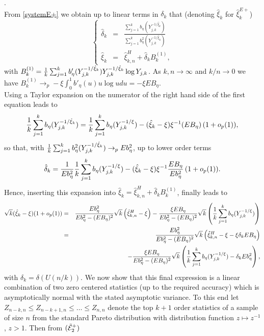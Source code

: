 \documentclass[twoside,leqno,11pt]{article}
\begin{document}
. \\
From \eqref{systemE+} we obtain up to linear terms in $\delta_k$ that (denoting $\hat{\xi}_k$ for $\hat{\xi}^{E+}_k$)
\[
\left\{
\begin{array}{lcl}
\hat{\delta}_k &=& \frac{\sum_{j=1}^k b_\eta (Y_{j,k}^{-1/\hat{\xi}_k})}{\sum_{j=1}^k b^2_\eta (Y_{j,k}^{-1/\hat{\xi}_k})} \\
\hat{\xi}_k &=& \hat{\xi}^H_{k,n} + \hat{\delta}_k B^{(1)}_{k},
\end{array}
\right.
\]
with $B^{(1)}_{k}= {1 \over k}\sum_{j=1}^k b'_\eta (Y_{j,k}^{-1/\hat{\xi}_k})Y_{j,k}^{-1/\hat{\xi}_k}\log Y_{j,k}$. As $k,n \to \infty$ and $k/n \to 0$ we have $B^{(1)}_{k} \to_p -\xi \int_0^1 b'_{\eta}(u) u \log u du = -\xi EB_\eta$.
\\
Using a Taylor expansion on the numerator of the right hand side of the first equation  leads to
\[
{1 \over k}\sum_{j=1}^k b_\eta (Y_{j,k}^{-1/\hat{\xi}_k})
=
{1 \over k}\sum_{j=1}^k b_\eta (Y_{j,k}^{-1/\xi})
- (\hat{\xi}_k - \xi) \xi^{-1} (EB_\eta) \, (1+o_p(1)), 
\]
so that, with ${1 \over k}\sum_{j=1}^k b^2_\eta (Y_{j,k}^{-1/\hat{\xi}_k}) \to_p E b^2_{\eta}$, up to lower order terms
\[
\hat{\delta}_k = {1 \over E b^2_{\eta}} {1 \over k}\sum_{j=1}^k b_\eta (Y_{j,k}^{-1/\xi})
- (\hat{\xi}_k - \xi) \xi^{-1}\frac{EB_\eta }{E b^2_{\eta}} \, (1+o_p(1)).
\]
Hence, inserting this expansion into $\hat{\xi}_k = \hat{\xi}^H_{k,n} + \hat{\delta}_k B^{(1)}_{k}$, 
finally leads to 
\begin{eqnarray*}
\sqrt{k}(\hat{\xi}_k - \xi)(1+o_p(1)) &=&
\frac{E b^2_{\eta}}{E b^2_{\eta}-(EB_\eta)^2} \sqrt{k}\left(\hat{\xi}^H_{k,n}-\xi \right)
-
\frac{\xi EB_\eta }{E b^2_{\eta}-(EB_\eta)^2 }\sqrt{k} \left( {1 \over k}\sum_{j=1}^k b_\eta (Y_{j,k}^{-1/\xi})\right)\\
&=& \frac{E b^2_{\eta}}{E b^2_{\eta}-(EB_\eta)^2} \sqrt{k}\left(\hat{\xi}^H_{k,n}-\xi - \xi \delta_k EB_\eta\right) 
\\ && \;\;
-
\frac{\xi EB_\eta }{E b^2_{\eta}-(EB_\eta)^2 }\sqrt{k} \left( {1 \over k}\sum_{j=1}^k b_\eta (Y_{j,k}^{-1/\xi})
- \delta_k E b^2_{\eta}
\right),
\end{eqnarray*}
with $\delta_k = \delta (U(n/k))$.
We now show  that this final expression is a linear combination of two zero centered statistics (up to the required accuracy)  which is asymptotically  normal with the stated asymptotic variance.  To this end let $Z_{n-k,n} \leq Z_{n-k+1,n} \leq \ldots \leq Z_{n,n}$ denote the top $k+1$ order statistics of a sample of size $n$ from the standard Pareto distribution with distribution function $z \mapsto z^{-1}$, $z>1$. Then from $({\tilde{\cal{E}}}_2^+) $
\end{document}
